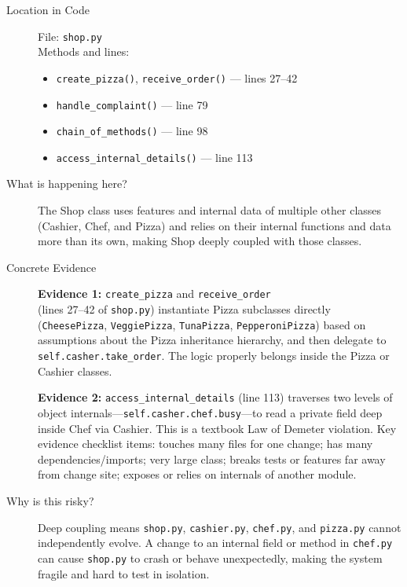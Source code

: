 \documentclass[12pt]{article}
\begin{document}
\begin{description}
    \item[Location in Code]
        File: \texttt{shop.py} \\
        Methods and lines:
        \begin{itemize}
            \item \texttt{create\_pizza()}, \texttt{receive\_order()} --- lines 27--42
            \item \texttt{handle\_complaint()} --- line 79
            \item \texttt{chain\_of\_methods()} --- line 98
            \item \texttt{access\_internal\_details()} --- line 113
        \end{itemize}

    \item[What is happening here?]
        The Shop class uses features and internal data of multiple other classes (Cashier, Chef,
        and Pizza) and relies on their internal functions and data more than its own, making Shop
        deeply coupled with those classes.

    \item[Concrete Evidence]
        \textbf{Evidence 1:} \texttt{create\_pizza} and \texttt{receive\_order} \\
         (lines 27--42 of \texttt{shop.py}) instantiate Pizza subclasses directly (\texttt{CheesePizza},
        \texttt{VeggiePizza}, \texttt{TunaPizza}, \texttt{PepperoniPizza}) based on assumptions
        about the Pizza inheritance hierarchy, and then delegate to \texttt{self.casher.take\_order}.
        The logic properly belongs inside the Pizza or Cashier classes.

        \textbf{Evidence 2:} \texttt{access\_internal\_details} (line 113) traverses two levels of
        object internals---\texttt{self.casher.chef.busy}---to read a private field deep inside
        Chef via Cashier. This is a textbook Law of Demeter violation. Key evidence checklist items:
        touches many files for one change; has many dependencies/imports; very large class; breaks
        tests or features far away from change site; exposes or relies on internals of another module.

    \item[Why is this risky?]
        Deep coupling means \texttt{shop.py}, \texttt{cashier.py}, \texttt{chef.py}, and
        \texttt{pizza.py} cannot independently evolve. A change to an internal field or method in
        \texttt{chef.py} can cause \texttt{shop.py} to crash or behave unexpectedly, making the
        system fragile and hard to test in isolation.


\end{description}
\end{document}
